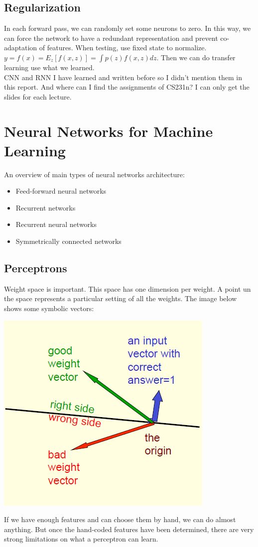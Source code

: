 \documentclass{article}
\begin{document}
\subsection{Regularization}
In each forward pass, we can randomly set some neurons to zero. In this way, we can force the network to have a redundant representation and prevent co-adaptation of features. When testing, use fixed state to normalize.$y = f(x) = E_z[f(x, z)] = \int p(z)f(x,z)dz$. Then we can do transfer learning use what we learned. \\
CNN and RNN I have learned and written before so I didn't mention them in this report. And where can I find the assignments of CS231n? I can only get the slides for each lecture.

\section{Neural Networks for Machine Learning}
An overview of main types of neural networks architecture:
\begin{itemize}
  \item Feed-forward neural networks
  \item Recurrent networks
  \item Recurrent neural networks
  \item Symmetrically connected networks
\end{itemize}

\subsection{Perceptrons}
Weight space is important. This space has one dimension per weight. A point un the space represents a particular setting of all the weights. The image below shows some symbolic vectors:
\begin{center}
\includegraphics[scale=0.8]{wightspace.png}
\end{center}
If we have enough features and can choose them by hand, we can do almost anything. But once the hand-coded features have been determined, there are very strong limitations on what a perceptron can learn.
\end{document}
